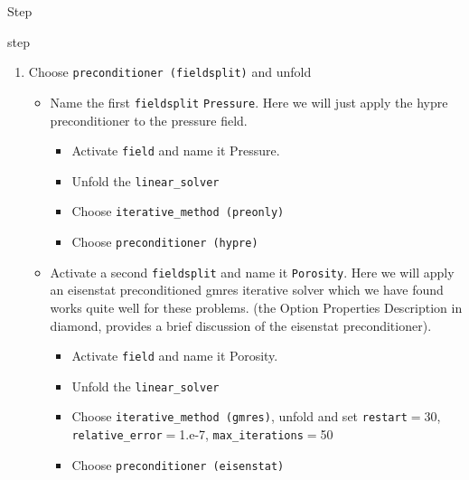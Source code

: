 \begin{steps}{Step}
\begin{steps}{step}
\begin{enumerate}
    \item Choose \texttt{preconditioner (fieldsplit)} and unfold
      \begin{itemize}
      \item Name the first \texttt{fieldsplit} \texttt{Pressure}.
        Here we will just apply the hypre preconditioner to the
        pressure field.
        \begin{itemize}
        \item Activate \texttt{field} and name it
          Pressure.
        \item Unfold the \texttt{linear\_solver}
        \item Choose \texttt{iterative\_method (preonly)} 
        \item Choose \texttt{preconditioner (hypre)} 
        \end{itemize}
      \item Activate a second \texttt{fieldsplit} and name it
        \texttt{Porosity}.  Here we will apply an eisenstat
        preconditioned gmres iterative solver which we have found
        works quite well for these problems. (the Option Properties
        Description in diamond, provides a brief discussion of the eisenstat preconditioner).
        \begin{itemize}
        \item Activate \texttt{field} and name it
          Porosity.
        \item Unfold the \texttt{linear\_solver}
        \item Choose \texttt{iterative\_method (gmres)}, unfold and set
         \texttt{restart}$=$30, \texttt{relative\_error}$=$1.e-7, \texttt{max\_iterations}$=$50
        \item Choose \texttt{preconditioner (eisenstat)} 
        \end{itemize}
      \end{itemize}
    \end{enumerate}
    

\end{steps}
\end{steps}
